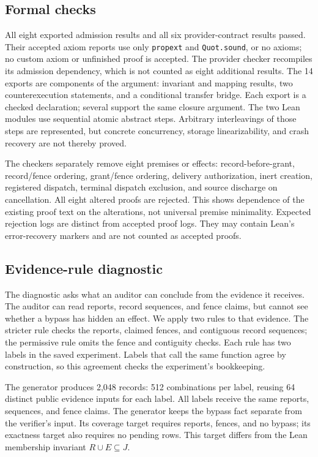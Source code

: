 \documentclass[11pt]{article}
\newcommand{\code}[1]{\texttt{\small #1}}
\begin{document}
\subsection{Formal checks}
All eight exported admission results and all six provider-contract results
passed. Their accepted axiom reports use only \code{propext} and
\code{Quot.sound}, or no axioms; no custom axiom or unfinished proof is accepted.
The provider checker recompiles its admission dependency, which is not counted
as eight additional results.
The 14 exports are components of the argument: invariant and mapping results,
two counterexecution statements, and a conditional transfer bridge. Each export
is a checked declaration; several support the same closure argument. The two Lean modules use sequential atomic abstract
steps. Arbitrary interleavings of those steps are represented, but concrete
concurrency, storage linearizability, and crash recovery are not thereby proved.

The checkers separately remove eight premises or effects: record-before-grant,
record/fence ordering, grant/fence ordering, delivery authorization, inert
creation, registered dispatch, terminal dispatch exclusion, and source discharge
on cancellation. All eight altered proofs are rejected. This shows dependence
of the existing proof text on the alterations, not universal premise minimality.
Expected rejection logs are distinct from accepted proof logs. They may contain
Lean's error-recovery markers and are not counted as accepted proofs.

\subsection{Evidence-rule diagnostic}
\label{sec:diagnostic}
The diagnostic asks what an auditor can conclude from the evidence it receives.
The auditor can read reports, record sequences, and fence claims, but cannot
see whether a bypass has hidden an effect. We apply two rules to that evidence.
The stricter rule checks the reports, claimed fences, and contiguous record
sequences; the permissive rule omits the fence and contiguity checks. Each rule
has two labels in the saved experiment. Labels that call the same function
agree by construction, so this agreement checks the experiment's bookkeeping.

The generator produces 2,048 records: 512 combinations per label, reusing 64
distinct public evidence inputs for each label. All labels receive the same
reports, sequences, and fence claims. The generator keeps the bypass fact
separate from the verifier's input. Its coverage target requires reports,
fences, and no bypass; its exactness target also requires no pending rows.
This target differs from the Lean membership invariant $R\cup E\subseteq J$.
\end{document}
